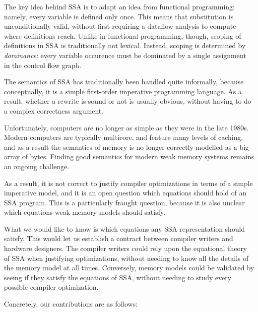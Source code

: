 \documentclass[acmsmall,screen,review]{acmart}
\begin{document}
The key idea behind SSA is to adapt an idea from functional
programming: namely, every variable is defined only once. This means
that substitution is unconditionally valid, without first requiring a
dataflow analysis to compute where definitions reach. Unlike in
functional programming, though, scoping of definitions in SSA is
traditionally not lexical. Instead, scoping is determined by
\emph{dominance}: every variable occurence must be dominated by a
single assignment in the control flow graph.

The semantics of SSA has traditionally been handled quite informally,
because conceptually, it is a simple first-order imperative
programming language. As a result, whether a rewrite is sound or
not is usually obvious, without having to do a complex correctness
argument.

Unfortunately, computers are no longer as simple as they were in the
late 1980s. Modern computers are typically multicore, and feature many
levels of caching, and as a result the semantics of memory is no
longer correctly modelled as a big array of bytes. Finding good
semantics for modern weak memory systems remains an ongoing challenge.

As a result, it is not correct to justify compiler optimizations in
terms of a simple imperative model, and it is an open question which
equations should hold of an SSA program. This is a particularly
fraught question, because it is also unclear which equations weak
memory models should satisfy.

What we would like to know is which equations any SSA representation
should satisfy. This would let us establish a contract between
compiler writers and hardware designers. The compiler writers could
rely upon the equational theory of SSA when justifying optimizations,
without needing to know all the details of the memory model at all
times.  Conversely, memory models could be validated by seeing if they
satisfy the equations of SSA, without needing to study every possible
compiler optimization.

Concretely, our contributions are as follows: 
\end{document}
